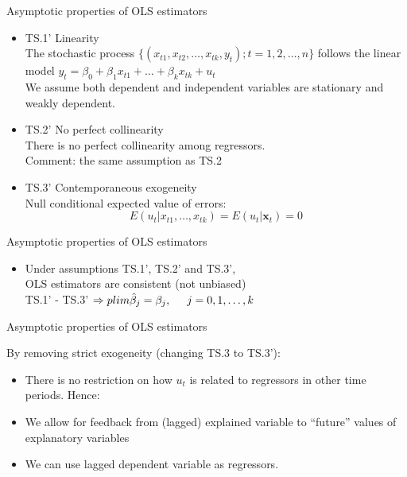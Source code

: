 \documentclass{beamer}
\begin{document}

\begin{frame}{Asymptotic properties of OLS estimators}
\begin{itemize}
\item TS.1' Linearity \\The stochastic process 
$\{(x_{t1},x_{t2},\dots,x_{tk},y_t);t=1,2,\dots, n\}$ follows the linear model $ y_t = \beta_0 + \beta_1 x_{t1} + \dots + \beta_k x_{tk}+u_t$ 
\\ We assume both dependent and independent variables are stationary and weakly dependent.
\vspace{0.5cm}
\item TS.2' No perfect collinearity \\
There is no perfect collinearity among regressors. \\
{\footnotesize Comment: the same assumption as TS.2}
\vspace{0.5cm}
\item TS.3' Contemporaneous exogeneity 
\\Null conditional expected value of errors: 
$$E(u_t|x_{t1},\dots,x_{tk})=E(u_t|\boldsymbol{x}_t)=0$$
\end{itemize}
\end{frame}


\begin{frame}{Asymptotic properties of OLS estimators}
\begin{itemize}
\item Under assumptions TS.1', TS.2' and TS.3', \\OLS estimators are consistent (not unbiased)\\
\vspace{0.5cm}
TS.1' - TS.3' $\Rightarrow plim\hat{\beta}_j = \beta_j, \hspace{0.5cm} j=0, 1, \dots, k$
\end{itemize}
\end{frame}


\begin{frame}{Asymptotic properties of OLS estimators}

By removing strict exogeneity (changing TS.3 to TS.3'):
\vspace{0.5cm}
\begin{itemize}
\item There is no restriction on how $u_t$ is related to regressors in other time periods. Hence: 
\vspace{0.5cm}

\item We allow for feedback from (lagged) explained variable to ``future'' values of explanatory variables 
\vspace{0.5cm}

\item We can use lagged dependent variable as regressors.
\end{itemize}

\end{frame}
\end{document}
